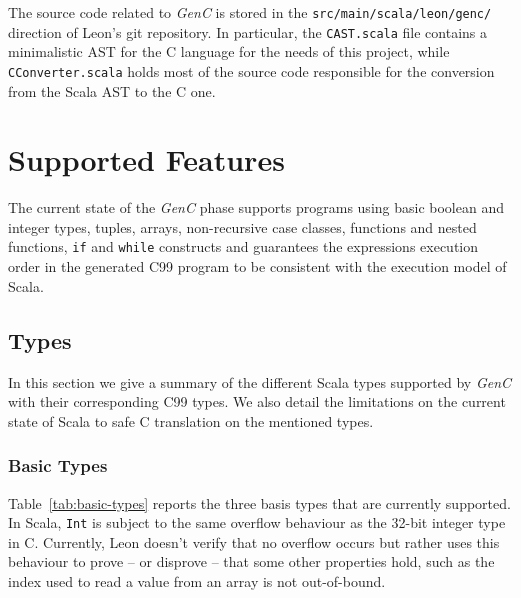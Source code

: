 \documentclass{article}
\newcommand{\inlinecode}[1]{\lstinline[basicstyle=\ttfamily]|#1|}
\newcommand{\inlineScala}[1]{\lstinline[language=MyScala]|#1|}
\newcommand{\GenC}{\emph{GenC}\xspace}
\begin{document}
The source code related to \GenC is stored in the
\inlinecode{src/main/scala/leon/genc/} direction of Leon's git repository. In
particular, the \inlinecode{CAST.scala} file contains a minimalistic AST for the
C language for the needs of this project, while \inlinecode{CConverter.scala}
holds most of the source code responsible for the conversion from the Scala AST
to the C one.



\section{Supported Features}

The current state of the \GenC phase supports programs using basic boolean and
integer types, tuples, arrays, non-recursive case classes, functions and nested
functions, \inlinecode{if} and \inlinecode{while} constructs and guarantees the
expressions execution order in the generated C99 program to be consistent with
the execution model of Scala.



\subsection{Types}
\label{sec:types}

In this section we give a summary of the different Scala types supported by
\GenC with their corresponding C99 types. We also detail the limitations on the
current state of Scala to safe C translation on the mentioned types.



\subsubsection{Basic Types}
\label{sec:basic-types}

Table~\ref{tab:basic-types} reports the three basis types that are currently
supported. In Scala, \inlineScala{Int} is subject to the same overflow behaviour
as the 32-bit integer type in C. Currently, Leon doesn't verify that no overflow
occurs but rather uses this behaviour to prove -- or disprove -- that some other
properties hold, such as the index used to read a value from an array is not
out-of-bound.
\end{document}

